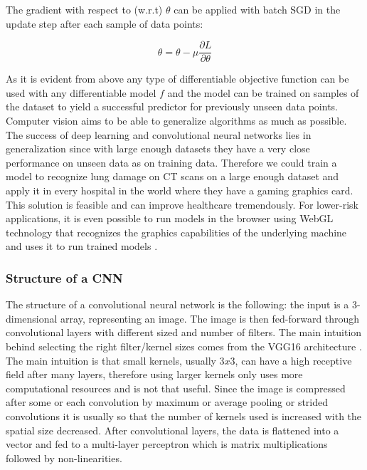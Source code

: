 \documentclass[a4paper,12pt]{article}
\begin{document}
\vspace{4mm}

\par The gradient with respect to (w.r.t) $\theta$ can be applied with batch SGD in the update step after each sample of data points:

\vspace{4mm}

\begin{equation}
    \theta = \theta - \mu \frac{\partial L}{\partial \theta}
\end{equation}

\vspace{4mm}

\par As it is evident from above any type of differentiable objective function can be used with any differentiable model $f$ and the model can be trained on samples of the dataset to yield a successful predictor for previously unseen data points. Computer vision aims to be able to generalize algorithms as much as possible. The success of deep learning and convolutional neural networks lies in generalization since with large enough datasets they have a very close performance on unseen data as on training data. Therefore we could train a model to recognize lung damage on CT scans on a large enough dataset and apply it in every hospital in the world where they have a gaming graphics card. This solution is feasible and can improve healthcare tremendously. For lower-risk applications, it is even possible to run models in the browser using WebGL technology that recognizes the graphics capabilities of the underlying machine and uses it to run trained models \cite{cohen2019chester}.

\vspace{4mm}

\subsubsection{Structure of a CNN}

\par The structure of a convolutional neural network is the following: the input is a 3-dimensional array, representing an image. The image is then fed-forward through convolutional layers with different sized and number of filters. The main intuition behind selecting the right filter/kernel sizes comes from the VGG16 architecture \cite{simonyan2014very}. The main intuition is that small kernels, usually $3x3$, can have a high receptive field after many layers, therefore using larger kernels only uses more computational resources and is not that useful. Since the image is compressed after some or each convolution by maximum or average pooling or strided convolutions it is usually so that the number of kernels used is increased with the spatial size decreased. After convolutional layers, the data is flattened into a vector and fed to a multi-layer perceptron which is matrix multiplications followed by non-linearities.
\end{document}
